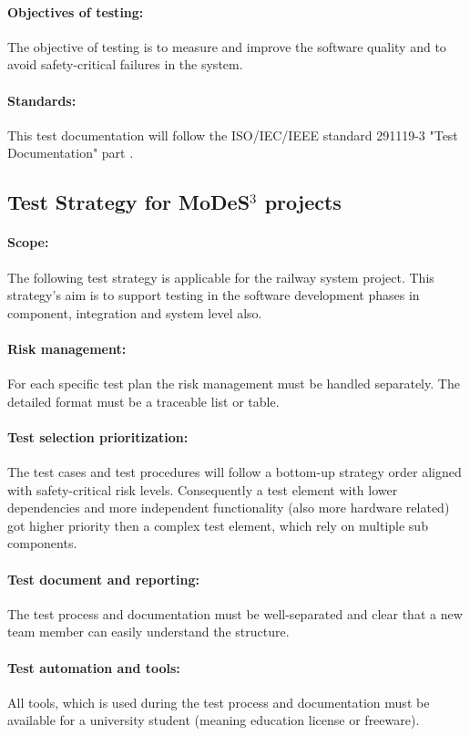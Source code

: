 \paragraph{Objectives of testing:} The objective of testing is to measure and improve the software quality and to avoid safety-critical failures in the system.
\paragraph{Standards:} This test documentation will follow the ISO/IEC/IEEE standard 291119-3 "Test Documentation" part \cite{IEEE13}.

\subsection{Test Strategy for MoDeS$^3$ projects}
\paragraph{Scope:} The following test strategy is applicable for the railway system project. This strategy's aim is to support testing in the software development phases in component, integration and system level also.
\paragraph{Risk management:} For each specific test plan the risk management must be handled separately. The detailed format must be a traceable list or table. 
\paragraph{Test selection prioritization:} The test cases and test procedures will follow a bottom-up strategy order aligned with safety-critical risk levels. Consequently a test element with lower dependencies and more independent functionality (also more hardware related) got higher priority then a complex test element, which rely on multiple sub components.
\paragraph{Test document and reporting:} The test process and documentation must be well-separated and clear that a new team member can easily understand the structure.
\paragraph{Test automation and tools:} All tools, which is used during the test process and documentation must be available for a university student (meaning education license or freeware).
